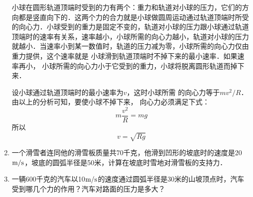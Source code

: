 \begin{enumerate}
\begin{figure}[htp]
\begin{tikzpicture}[>=latex, scale=1.3]
\end{tikzpicture}
\caption{}
\end{figure}

\begin{solution}
小球在圆形轨道顶端时受到的力有两个：重力和轨道对小球的压力，它们的方向都是竖直向下的．这两个力的合力就是小球做圆周运动通过轨道顶端时所受的向心力．小球受到的重力是固定不变的，轨道对小球的压力跟小球通过轨道顶端时的速率有关系，速率越小，小球所需的向心力越小，轨道对小球的压力就越小．当速率小到某一数值时，轨道的压力减为零，小球所需的向心力仅由重力提供，这个速率就是
小球滑到轨道顶端时不掉下来的最小速率．如果速率再小，
小球所需的向心力小于它受到的重力，小球将脱离圆形轨道而掉下来．

设小球通过轨道顶端时的最小速率为$v$，这时小球所需
的向心力等于$mv^2/R$．
由以上的分析可知，要使小球不掉下来，
向心力必须满足下式：\[m\frac{v^2}{R}=mg \]
所以\[v=\sqrt{Rg} \]
\end{solution}

\item  一个滑雪者连同他的滑雪板质量共70千克，他滑到凹形的坡底时的速度是20$\ms$，坡底的圆弧半径是50米，计算在坡底时雪地对滑雪板的支持力．
\item  一辆600千克的汽车以10$\ms$的速度通过圆弧半径是30米的山坡顶点时，汽车受到哪几个力的作用？汽车对路面的压力是多大？

\end{enumerate}


















